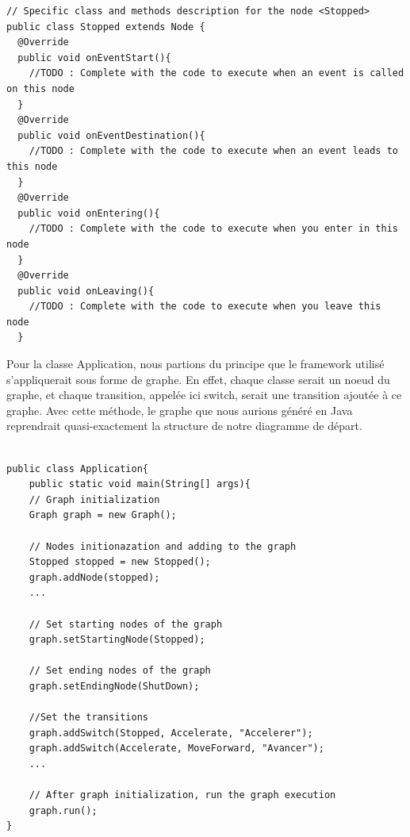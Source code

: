\documentclass[french, 12pt, a4paper]{article}
\begin{document}
	\begin{lstlisting}[caption={Exemple de classe à générer en utilisant le premier diagramme.},basicstyle=\small]
 // Specific class and methods description for the node <Stopped>
public class Stopped extends Node {
  @Override
  public void onEventStart(){
    //TODO : Complete with the code to execute when an event is called on this node
  }
  @Override
  public void onEventDestination(){
    //TODO : Complete with the code to execute when an event leads to this node
  }
  @Override
  public void onEntering(){
    //TODO : Complete with the code to execute when you enter in this node
  }
  @Override 
  public void onLeaving(){
    //TODO : Complete with the code to execute when you leave this node
  }

	\end{lstlisting}
	
	Pour la classe Application, nous partions du principe que le framework utilisé s'appliquerait sous forme de graphe. En effet, chaque classe serait un noeud du graphe, et chaque transition, appelée ici switch, serait une transition ajoutée à ce graphe. Avec cette méthode, le graphe que nous aurions généré en Java reprendrait quasi-exactement la structure de notre diagramme de départ.
	
	\begin{lstlisting}[caption={Classe application à générer.},basicstyle=\small]

public class Application{
    public static void main(String[] args){
    // Graph initialization
    Graph graph = new Graph();
    
    // Nodes initionazation and adding to the graph
    Stopped stopped = new Stopped();
    graph.addNode(stopped);
    ...
    
    // Set starting nodes of the graph
    graph.setStartingNode(Stopped);
    
    // Set ending nodes of the graph
    graph.setEndingNode(ShutDown);
    
    //Set the transitions
    graph.addSwitch(Stopped, Accelerate, "Accelerer");
    graph.addSwitch(Accelerate, MoveForward, "Avancer");
    ...

    // After graph initialization, run the graph execution
    graph.run();
}
	\end{lstlisting}

    
\end{document}
